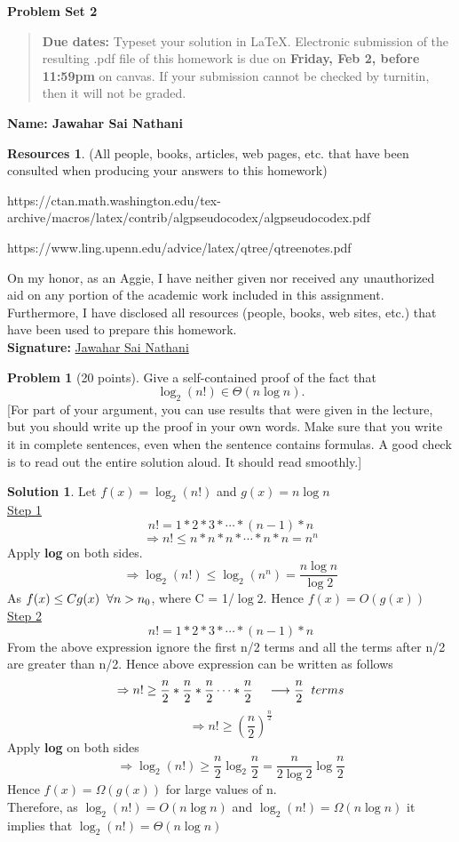 \documentclass{article}
\theoremstyle{definition}
\newtheorem{problem}{Problem}
\newtheorem*{solution}{Solution}
\newtheorem*{resources}{Resources}
\newcommand{\name}[1]{\noindent\textbf{Name: {#1}}}
\newcommand{\honor}{\noindent On my honor, as an Aggie, I have neither
  given nor received any unauthorized aid on any portion of the
  academic work included in this assignment. Furthermore, I have
  disclosed all resources (people, books, web sites, etc.) that have
  been used to prepare this homework. \\[1ex]
 \textbf{Signature:} \underline{Jawahar Sai Nathani}{\hspace*{5cm}} }
\newcommand{\problemset}[1]{\begin{center}\textbf{Problem Set #1}\end{center}}
\newcommand{\duedate}[1]{\begin{quote}\textbf{Due dates:} Typeset your
    solution in \LaTeX{}. Electronic
    submission of the resulting .pdf file of this homework is due on
    \textbf{#1} on canvas. If your submission cannot be checked by
    turnitin, then it will not be graded.\end{quote} }
\begin{document}
\problemset{2}
\duedate{Friday, Feb 2, before 11:59pm}
\name{Jawahar Sai Nathani}
\begin{resources} (All people, books, articles, web pages, etc. that
  have been consulted when producing your answers to this homework)
  \item https://ctan.math.washington.edu/tex-archive/macros/latex/contrib/algpseudocodex/algpseudocodex.pdf
  \item https://www.ling.upenn.edu/advice/latex/qtree/qtreenotes.pdf
\end{resources}
\honor

\newpage

\begin{problem}[20 points] 
Give a self-contained proof of the fact that 
$$\log_2(n!)\in \Theta(n\log n).$$
[For part of your argument, you can use results that were given in the
lecture, but you should write up the proof in your own words. Make
sure that you write it in complete sentences, even when the sentence
contains formulas. A good check is to read out the entire solution
aloud. It should read smoothly.] 
\end{problem}
\begin{solution}
Let $f(x) = \log_2(n!)$ and $g(x) = n\log{n}$ \\
\underline{Step 1}
$$n! = 1 * 2 * 3 * \cdots * (n-1) * n$$
$$\Rightarrow n! \leq n * n * n * \cdots * n * n = n^n$$
Apply \textbf{log} on both sides.
$$\Rightarrow \log_2(n!) \leq \log_2(n^n) = \frac{n\log{n}}{\log{2}}$$
As $f(x) \leq Cg(x) \hspace{2mm} \forall n > n_0$, where C = 1/$\log{2}$. Hence $f(x) = O(g(x))$ \\

\underline{Step 2}
$$n! = 1 * 2 * 3 * \cdots * (n-1) * n$$
From the above expression ignore the first n/2 terms and all the terms after n/2 are greater than n/2. Hence above expression can be written as follows
$$\Rightarrow n! \geq \frac{n}{2} * \frac{n}{2} * \frac{n}{2} \cdots * \frac{n}{2} \hspace{4mm} \longrightarrow \frac{n}{2} \hspace{2mm} terms$$
$$\Rightarrow n! \geq (\frac{n}{2})^{\frac{n}{2}}$$
Apply \textbf{log} on both sides
$$\Rightarrow \log_2(n!) \geq \frac{n}{2}\log_2{\frac{n}{2}} = \frac{n}{2\log2}\log{\frac{n}{2}}$$
Hence $f(x) = \Omega(g(x))$ for large values of n. \\
Therefore, as $\log_2(n!) = O(n\log{n})$ and $\log_2(n!) = \Omega(n\log{n})$ it implies that $\log_2(n!) = \Theta(n\log{n})$
\end{solution}  
\newpage
\end{document}
